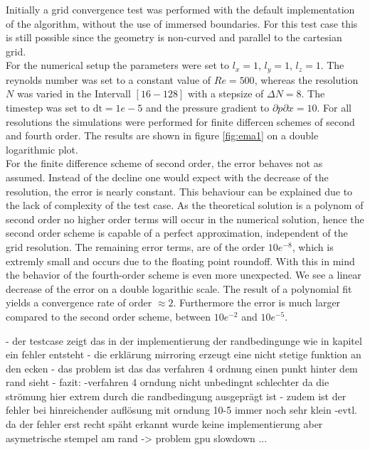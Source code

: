 Initially a grid convergence test was performed with the default implementation of the algorithm, without the use of immersed boundaries.
For this test case this is still possible since the geometry is non-curved and parallel to the cartesian grid.\\
For the  numerical setup the parameters were set to $l_x=1$, $l_y=1$, $l_z=1$.
The reynolds number was set to a constant value of $Re=500$, whereas the resolution $N$ was varied in the Intervall $[16 - 128]$ with a stepsize of $\Delta N = 8$.
The timestep was set to $\mathrm{dt}=1e-5$ and the pressure gradient to $\partial p \partial x  = 10$.
For all resolutions the simulations were performed for finite differcen schemes of second and fourth order.
The results are shown in figure \ref{fig:ema1} on a double logarithmic plot.\\
For the finite difference scheme of second order, the error behaves not as assumed.
Instead of the decline one would expect with the decrease of the resolution, the  error is nearly constant.
This behaviour can be explained due to the lack of complexity of the test case. As the theoretical solution is a polynom of second order
no higher order terms will occur in the numerical solution, hence the second order scheme is capable of a perfect approximation, independent of the
grid resolution. The remaining error terms, are of the order $10e^{-8}$, which is extremly small and occurs due to the floating point roundoff.
With this in mind the behavior of the fourth-order scheme is even more unexpected.
We see a linear decrease of the error on a double logarithic scale.
The result of a polynomial fit yields a convergence rate of order $\approx 2$.
Furthermore the error is much larger compared to the second order scheme, between $10e^{-2}$ and $10e^{-5}$.

- der testcase zeigt das in der implementierung der randbedingunge wie in kapitel  ein fehler entsteht
- die erklärung mirroring  erzeugt eine nicht stetige funktion an den ecken
- das problem ist das das verfahren 4 ordnung einen punkt hinter dem rand sieht
- fazit:
    -verfahren 4 orndung nicht unbedingnt schlechter da die strömung hier extrem durch die randbedingung ausgeprägt ist
    - zudem ist der fehler bei hinreichender auflösung mit orndung 10-5 immer noch sehr klein
    -evtl. da der fehler erst recht späht erkannt wurde keine implementierung aber
        asymetrische stempel am rand -> problem gpu slowdown ...

\newpage

